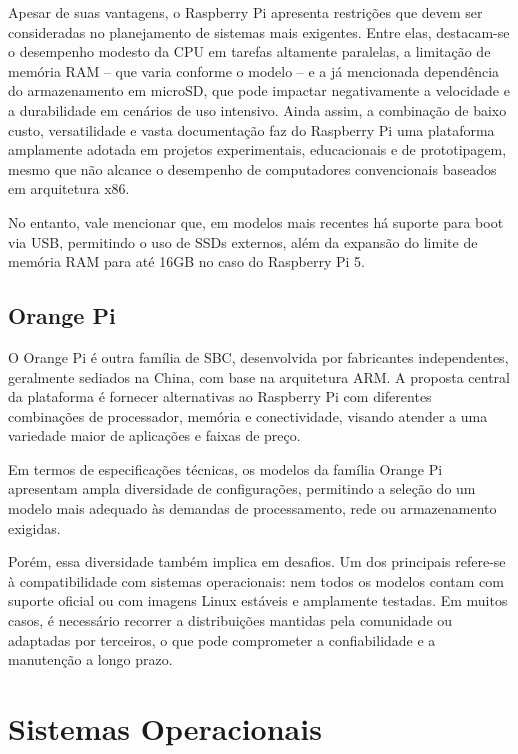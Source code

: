Apesar de suas vantagens, o Raspberry Pi apresenta restrições que devem ser consideradas no planejamento de sistemas mais exigentes. Entre elas, destacam-se o desempenho modesto da CPU em tarefas altamente paralelas, a limitação de memória RAM -- que varia conforme o modelo -- e a já mencionada dependência do armazenamento em microSD, que pode impactar negativamente a velocidade e a durabilidade em cenários de uso intensivo. Ainda assim, a combinação de baixo custo, versatilidade e vasta documentação faz do Raspberry Pi uma plataforma amplamente adotada em projetos experimentais, educacionais e de prototipagem, mesmo que não alcance o desempenho de computadores convencionais baseados em arquitetura x86.

No entanto, vale mencionar que, em modelos mais recentes há suporte para boot via USB, permitindo o uso de SSDs externos, além da expansão do limite de memória RAM para até 16GB no caso do Raspberry Pi 5. 

\subsection{Orange Pi}
\label{subsection:OrangePi}

O Orange Pi \citep{orangepihw2025} é outra família de SBC, desenvolvida por fabricantes independentes, geralmente sediados na China, com base na arquitetura ARM. A proposta central da plataforma é fornecer alternativas ao Raspberry Pi com diferentes combinações de processador, memória e conectividade, visando atender a uma variedade maior de aplicações e faixas de preço.

Em termos de especificações técnicas, os modelos da família Orange Pi apresentam ampla diversidade de configurações, permitindo a seleção do um modelo mais adequado às demandas de processamento, rede ou armazenamento exigidas.

Porém, essa diversidade também implica em desafios. Um dos principais refere-se à compatibilidade com sistemas operacionais: nem todos os modelos contam com suporte oficial ou com imagens Linux estáveis e amplamente testadas. Em muitos casos, é necessário recorrer a distribuições mantidas pela comunidade ou adaptadas por terceiros, o que pode comprometer a confiabilidade e a manutenção a longo prazo.


\section{Sistemas Operacionais}
\label{section:SistemasOperacionais}

